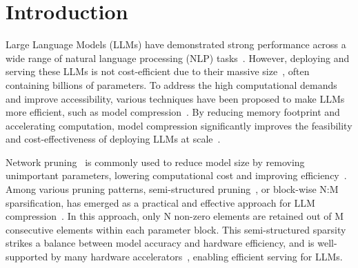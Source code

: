 \vspace{-2em}
\section{Introduction}



Large Language Models (LLMs) have demonstrated strong performance across a wide range of natural language processing (NLP) tasks~\cite{brown2020language, achiam2023gpt, wei2022emergent}. However, deploying and serving these LLMs is not cost-efficient due to their massive size~\cite{frantar2023sparsegpt, yuan2024kv}, often containing billions of parameters. To address the high computational demands and improve accessibility, various techniques have been proposed to make LLMs more efficient, such as model compression~\cite{han2015deep, frantar2022gptq}. By reducing memory footprint and accelerating computation, model compression significantly improves the feasibility and cost-effectiveness of deploying LLMs at scale~\cite{liu2024kivi, frantar2022gptq, lin2024awq}.

Network pruning~\cite{lecun1989optimal} is commonly used to reduce model size by removing unimportant parameters, lowering computational cost and improving efficiency~\cite{bai2024sparsellmglobalpruningpretrained}. Among various pruning patterns, semi-structured pruning~\cite{mishra2021accelerating}, or block-wise N:M sparsification, has emerged as a practical and effective approach for LLM compression~\cite{sun2023simple, fang2024maskllm}.
In this approach, only N non-zero elements are retained out of M consecutive elements within each parameter block. This semi-structured sparsity strikes a balance between model accuracy and hardware efficiency, and is well-supported by many hardware accelerators~\cite{mishra2021accelerating}, enabling efficient serving for LLMs. 


